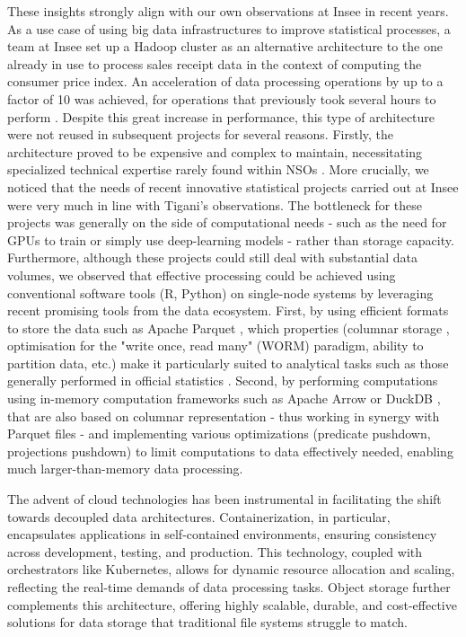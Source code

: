These insights strongly align with our own observations at Insee in recent years. As a use case of using big data infrastructures to improve statistical processes, a team at Insee set up a Hadoop cluster as an alternative architecture to the one already in use to process sales receipt data in the context of computing the consumer price index. An acceleration of data processing operations by up to a factor of 10 was achieved, for operations that previously took several hours to perform \cite{leclair2019utiliser}. Despite this great increase in performance, this type of architecture were not reused in subsequent projects for several reasons. Firstly, the architecture proved to be expensive and complex to maintain, necessitating specialized technical expertise rarely found within NSOs \cite{vale2015international}. More crucially, we noticed that the needs of recent innovative statistical projects carried out at Insee were very much in line with Tigani's observations. The bottleneck for these projects was generally on the side of computational needs - such as the need for GPUs to train or simply use deep-learning models - rather than storage capacity. Furthermore, although these projects could still deal with substantial data volumes, we observed that effective processing could be achieved using conventional software tools (R, Python) on single-node systems by leveraging recent promising tools from the data ecosystem. First, by using efficient formats to store the data such as Apache Parquet \cite{parquet2013}, which properties (columnar storage \cite{abadi2013design}, optimisation for the "write once, read many" (WORM) paradigm, ability to partition data, etc.) make it particularly suited to analytical tasks such as those generally performed in official statistics \cite{abdelaziz2023optimizing}. Second, by performing computations using in-memory computation frameworks such as Apache Arrow \cite{arrow2016} or DuckDB \cite{raasveldt2019duckdb}, that are also based on columnar representation - thus working in synergy with Parquet files - and implementing various optimizations (predicate pushdown, projections pushdown) to limit computations to data effectively needed, enabling much larger-than-memory data processing.

The advent of cloud technologies has been instrumental in facilitating the shift towards decoupled data architectures. Containerization, in particular, encapsulates applications in self-contained environments, ensuring consistency across development, testing, and production. This technology, coupled with orchestrators like Kubernetes, allows for dynamic resource allocation and scaling, reflecting the real-time demands of data processing tasks. Object storage further complements this architecture, offering highly scalable, durable, and cost-effective solutions for data storage that traditional file systems struggle to match. 

